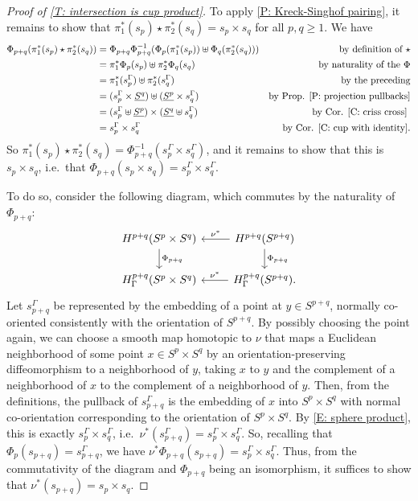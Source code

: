 \begin{proof}[Proof of \cref{T: intersection is cup product}]
	To apply \cref{P: Kreck-Singhof pairing}, it remains to show that $\pi_1^*(s_p) \star \pi_2^*(s_q) = s_p \times s_q$ for all $p,q\geq 1$.
	We have
	\begin{align*}
		\Phi_{p+q}(\pi_1^*(s_p) \star \pi_2^*(s_q))& = \Phi_{p+q}\Phi_{p+q}^{-1}(\Phi_p(\pi_1^*(s_p))\uplus\Phi_q(\pi_2^*(s_q)))&\text{by definition of $\star$}\\
		& = \pi_1^*\Phi_p(s_p)\uplus\pi_2^*\Phi_q(s_q)&\text{by naturality of the $\Phi$}\\
		& = \pi_1^*(s_p^\Gamma)\uplus\pi_2^*(s_q^\Gamma)&\text{by the preceding}\\
		& = (s_p^\Gamma \times \underline{S^q})\uplus(\underline{S^p} \times s_q^\Gamma)&\text{by Prop.
			\ref{P: projection pullbacks}}\\
		& = (s_p^\Gamma\uplus \underline{S^p})\times( \underline{S^q}\uplus s_q^\Gamma)&\text{by Cor.
			\ref{C: criss cross} }\\
		& = s_p^\Gamma \times s_q^\Gamma&\text{by Cor.
			\ref{C: cup with identity}}.
	\end{align*}
	So $\pi_1^*(s_p) \star \pi_2^*(s_q) = \Phi_{p+q}^{-1}(s_p^\Gamma \times s_q^\Gamma)$, and it remains to show that this is $s_p \times s_q$, i.e.\ that $\Phi_{p+q}(s_p \times s_q) = s_p^\Gamma \times s_q^\Gamma$.

	To do so, consider the following diagram, which commutes by the naturality of $\Phi_{p+q}$:
	\[
	\begin{tikzcd}
		H^{p+q}(S^p \times S^q) \arrow{d}{\Phi_{p+q}} &
		H^{p+q}(S^{p+q}) \arrow[l, "\nu^*"'] \arrow{d}{\Phi_{p+q}} \\
		H^{p+q}_\Gamma(S^p \times S^q) &
		H_\Gamma^{p+q}(S^{p+q}) \arrow[l, "\nu^*"'].
	\end{tikzcd}
	\]
	Let $s_{p+q}^\Gamma$ be represented by the embedding of a point at $y \in S^{p+q}$, normally co-oriented consistently with the orientation of $S^{p+q}$.
	By possibly choosing the point again, we can choose a smooth map homotopic to $\nu$ that maps a Euclidean neighborhood of some point $x \in S^p \times S^q$ by an orientation-preserving diffeomorphism to a neighborhood of $y$, taking $x$ to $y$ and the complement of a neighborhood of $x$ to the complement of a neighborhood of $y$.
	Then, from the definitions, the pullback of $s_{p+q}^\Gamma$ is the embedding of $x$ into $S^p \times S^q$ with normal co-orientation corresponding to the orientation of $S^p \times S^q$.
	By \cref{E: sphere product}, this is exactly $s_p^\Gamma \times s_q^\Gamma$, i.e.\ $\nu^*(s_{p+q}^\Gamma) = s_p^\Gamma \times s_q^\Gamma$.
	So, recalling that $\Phi_p(s_{p+q}) = s_{p+q}^\Gamma$, we have $\nu^*\Phi_{p+q}(s_{p+q}) = s_p^\Gamma \times s_q^\Gamma$.
	Thus, from the commutativity of the diagram and $\Phi_{p+q}$ being an isomorphism, it suffices to show that $\nu^*(s_{p+q}) = s_p \times s_q$.


\end{proof}
